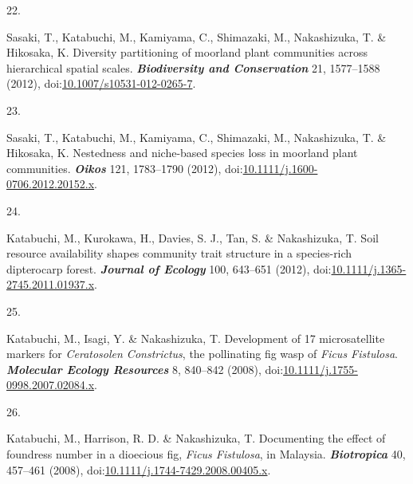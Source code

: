 \documentclass[
]{article}
\newlength{\cslhangindent}
\newlength{\csllabelwidth}
\newlength{\cslentryspacingunit} %
\newenvironment{CSLReferences}[2] %
 {%
  \setlength{\parindent}{0pt}
  \ifodd #1
  \let\oldpar\par
  \def\par{\hangindent=\cslhangindent\oldpar}
  \fi
  \setlength{\parskip}{#2\cslentryspacingunit}
 }%
 {}
\newcommand{\CSLLeftMargin}[1]{\parbox[t]{\csllabelwidth}{#1}}
\newcommand{\CSLRightInline}[1]{\parbox[t]{\linewidth - \csllabelwidth}{#1}\break}
\begin{document}
\begin{CSLReferences}{0}{0}
\leavevmode{}%
\CSLLeftMargin{22. }
\CSLRightInline{Sasaki, T., Katabuchi, M., Kamiyama, C., Shimazaki, M.,
Nakashizuka, T. \& Hikosaka, K. Diversity partitioning of moorland plant
communities across hierarchical spatial scales.
\textbf{\emph{Biodiversity and Conservation}} 21, 1577--1588 (2012),
doi:\href{https://doi.org/10.1007/s10531-012-0265-7}{10.1007/s10531-012-0265-7}.}

\leavevmode{}%
\CSLLeftMargin{23. }
\CSLRightInline{Sasaki, T., Katabuchi, M., Kamiyama, C., Shimazaki, M.,
Nakashizuka, T. \& Hikosaka, K. Nestedness and niche-based species loss
in moorland plant communities. \textbf{\emph{Oikos}} 121, 1783--1790
(2012),
doi:\href{https://doi.org/10.1111/j.1600-0706.2012.20152.x}{10.1111/j.1600-0706.2012.20152.x}.}

\leavevmode{}%
\CSLLeftMargin{24. }
\CSLRightInline{Katabuchi, M., Kurokawa, H., Davies, S. J., Tan, S. \&
Nakashizuka, T. Soil resource availability shapes community trait
structure in a species-rich dipterocarp forest. \textbf{\emph{Journal of
Ecology}} 100, 643--651 (2012),
doi:\href{https://doi.org/10.1111/j.1365-2745.2011.01937.x}{10.1111/j.1365-2745.2011.01937.x}.}

\leavevmode{}%
\CSLLeftMargin{25. }
\CSLRightInline{Katabuchi, M., Isagi, Y. \& Nakashizuka, T. Development
of 17 microsatellite markers for {\emph{Ceratosolen Constrictus}}, the
pollinating fig wasp of {\emph{Ficus Fistulosa}}.
\textbf{\emph{Molecular Ecology Resources}} 8, 840--842 (2008),
doi:\href{https://doi.org/10.1111/j.1755-0998.2007.02084.x}{10.1111/j.1755-0998.2007.02084.x}.}

\leavevmode{}%
\CSLLeftMargin{26. }
\CSLRightInline{Katabuchi, M., Harrison, R. D. \& Nakashizuka, T.
Documenting the effect of foundress number in a dioecious fig,
{\emph{Ficus Fistulosa}}, in {Malaysia}. \textbf{\emph{Biotropica}} 40,
457--461 (2008),
doi:\href{https://doi.org/10.1111/j.1744-7429.2008.00405.x}{10.1111/j.1744-7429.2008.00405.x}.}

\end{CSLReferences}
\end{document}
